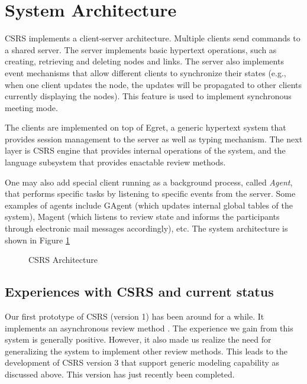 \section{System Architecture}
CSRS implements a client-server architecture. Multiple clients send
commands to a shared server. 
The server implements basic hypertext operations,
such as creating, retrieving and deleting nodes and links.
The server also implements event mechanisms
that allow different clients to synchronize their states (e.g., when one
client updates the node, the updates will be propagated to other clients
currently displaying the nodes). This  feature is used to
implement synchronous meeting mode.

The clients are implemented on top of Egret, a generic hypertext system
that provides session management to the server as well as typing
mechanism. The next layer is CSRS engine that provides internal
operations of the system, and the language subsystem that provides
enactable review methods.

One may also add special client running as a background process,
called {\it Agent}, that performs specific 
tasks by listening to specific events from the server.
Some examples of agents include GAgent (which updates internal global
tables of the system), Magent (which listens to review state
and informs the participants through electronic mail messages
accordingly), etc.  
The system architecture is shown in Figure \ref{fig:csrs-architecture}

\begin{figure}[h]
  \begin{center}
  \end{center}
  \caption{CSRS Architecture}
  \label{fig:csrs-architecture}
\end{figure}


\subsection{Experiences with CSRS and current status}

Our first prototype of CSRS (version 1)
has been around for a while. It implements an asynchronous review
method \cite{Johnson93}. 
The experience we gain from this system is generally positive.
However, it also made us realize the need
for generalizing the system to implement other review methods.  
This leads to the development of CSRS version 3 that support generic
modeling capability as discussed above. This version has just recently
been completed. 

